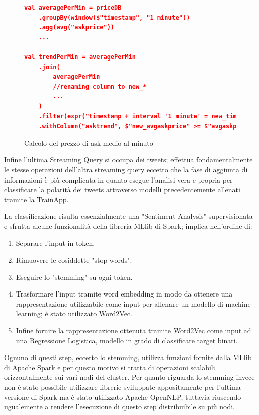 \begin{figure}
    \begin{lstlisting}[language=json,firstnumber=1]
val averagePerMin = priceDB
    .groupBy(window($"timestamp", "1 minute"))
    .agg(avg("askprice"))
    ...

val trendPerMin = averagePerMin
    .join(
        averagePerMin
        //renaming column to new_*
        ...
    )
    .filter(expr("timestamp + interval '1 minute' = new_timestamp"))
    .withColumn("asktrend", $"new_avgaskprice" >= $"avgaskprice")
    \end{lstlisting}
    \caption{Calcolo del prezzo di ask medio al minuto}
    \label{trendpermin}
\end{figure}

Infine l'ultima Streaming Query si occupa dei tweets; effettua fondamentalmente le stesse operazioni
dell'altra streaming query eccetto che la fase di aggiunta di informazioni è più complicata in quanto
esegue l'analisi vera e propria per classificare la polarità dei tweets attraverso modelli
precedentemente allenati tramite la TrainApp.

La classificazione risulta essenzialmente una "Sentiment Analysis" supervisionata e sfrutta alcune
funzionalità della libreria MLlib di Spark; implica nell'ordine di:

\begin{enumerate}
    \item Separare l'input in token.
    \item Rimuovere le cosiddette "stop-words".
    \item Eseguire lo "stemming" su ogni token.
    \item Trasformare l'input tramite word embedding in modo da ottenere una rappresentazione
    utilizzabile come input per allenare un modello di machine learning; è stato utilizzato
    Word2Vec.
    \item Infine fornire la rappresentazione ottenuta tramite Word2Vec come input ad una Regressione
    Logistica, modello in grado di classificare target binari.
\end{enumerate}

Ognuno di questi step, eccetto lo stemming, utilizza funzioni fornite dalla MLlib di Apache Spark
e per questo motivo si tratta di operazioni scalabili orizzontalmente sui vari nodi del cluster.
Per quanto riguarda lo stemming invece non è stato possibile utilizzare librerie sviluppate
appositamente per l'ultima versione di Spark ma è stato utilizzato Apache OpenNLP, tuttavia
riuscendo ugualemente a rendere l'esecuzione di questo step distribuibile su più nodi.

